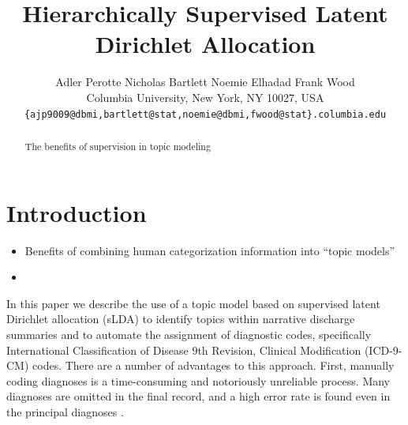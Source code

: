 \documentclass{article}
\title{Hierarchically Supervised Latent Dirichlet Allocation}
\author{
Adler Perotte\hspace{1cm} Nicholas Bartlett \hspace{1cm} Noemie Elhadad \hspace{1cm} Frank Wood\\
Columbia University, New York, NY 10027, USA \\
\texttt{\{ajp9009@dbmi,bartlett@stat,noemie@dbmi,fwood@stat\}.columbia.edu}
}
\begin{document}
\maketitle

\begin{abstract}
The benefits of supervision in topic modeling 
\end{abstract}

\section{Introduction}

\label{sec:introduction}

\begin{itemize}
\item Benefits of combining human categorization information into ``topic models''
\item 
\end{itemize}


%

In this paper we describe the use of a topic model based on supervised
latent Dirichlet allocation (sLDA) to identify topics within narrative
discharge summaries and to automate the assignment of diagnostic codes,
specifically International Classification of Disease 9th Revision,
Clinical Modification (ICD-9-CM) codes. There are a number of advantages
to this approach. First, manually coding diagnoses is a time-consuming
and notoriously unreliable process. Many diagnoses are omitted in
the final record, and a high error rate is found even in the principal
diagnoses \citep{Surjan1999}.
\end{document}
